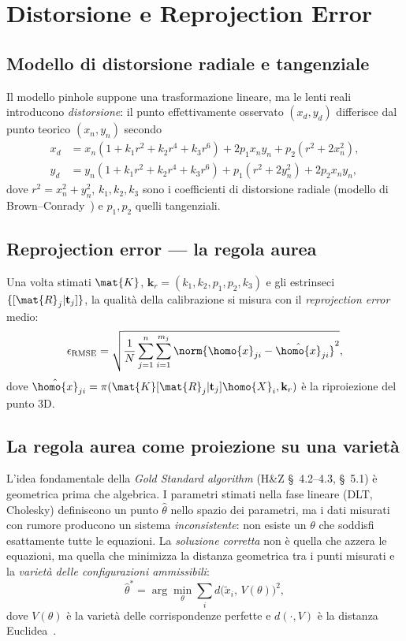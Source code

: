 \section{Distorsione e Reprojection Error}
\label{sec:distorsione}

\subsection{Modello di distorsione radiale e tangenziale}

Il modello pinhole suppone una trasformazione lineare, ma le lenti reali
introducono \emph{distorsione}: il punto effettivamente osservato
\((x_d,y_d)\) differisce dal punto teorico \((x_n,y_n)\) secondo
\begin{align}
  x_d &= x_n(1+k_1r^2+k_2r^4+k_3r^6)
        +2p_1x_ny_n+p_2(r^2+2x_n^2),\\
  y_d &= y_n(1+k_1r^2+k_2r^4+k_3r^6)
        +p_1(r^2+2y_n^2)+2p_2x_ny_n,
\end{align}
dove \(r^2=x_n^2+y_n^2\), \(k_1,k_2,k_3\) sono i coefficienti di
distorsione radiale (modello di Brown--Conrady~\cite{Brown1966}) e
\(p_1,p_2\) quelli tangenziali.

\subsection{Reprojection error --- la regola aurea}
\label{sub:reproj}

Una volta stimati \(\mat{K}\), \(\mathbf{k}_r=(k_1,k_2,p_1,p_2,k_3)\)
e gli estrinseci \(\{[\mat{R}_j|\mathbf{t}_j]\}\), la qualità della
calibrazione si misura con il \emph{reprojection error} medio:
\[
  \epsilon_{\text{RMSE}}
  =\sqrt{\frac{1}{N}\sum_{j=1}^{n}\sum_{i=1}^{m_j}
          \norm{\homo{x}_{ji}-\hat{\homo{x}}_{ji}}^2},
  \label{eq:reproj}
\]
dove \(\hat{\homo{x}}_{ji}=\pi(\mat{K}[\mat{R}_j|\mathbf{t}_j]\homo{X}_i,
\mathbf{k}_r)\) è la riproiezione del punto 3D.

\subsection{La regola aurea come proiezione su una varietà}
\label{sub:golden_rule}

L'idea fondamentale della \emph{Gold Standard algorithm} (H\&Z
§~4.2--4.3, §~5.1) è geometrica prima che algebrica.  I parametri
stimati nella fase lineare (DLT, Cholesky) definiscono un punto
\(\hat{\theta}\) nello spazio dei parametri, ma i dati misurati con
rumore producono un sistema \emph{inconsistente}: non esiste un
\(\theta\) che soddisfi esattamente tutte le equazioni.  La
\emph{soluzione corretta} non è quella che azzera le equazioni, ma
quella che minimizza la distanza geometrica tra i punti misurati e
la \emph{varietà delle configurazioni ammissibili}:
\[
  \hat{\theta}^* = \arg\min_{\theta}\sum_i
  d\bigl(\tilde{x}_i,\, V(\theta)\bigr)^2,
\]
dove \(V(\theta)\) è la varietà delle corrispondenze perfette e
\(d(\cdot,V)\) è la distanza Euclidea~\cite[Sez.~4.2.5]{HZ2004}.

